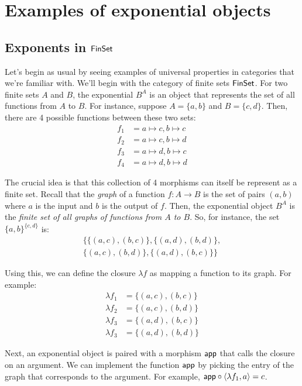 \section{Examples of exponential objects}

\subsection{Exponents in $\mathsf{FinSet}{}$}
Let's begin as usual by seeing examples of universal properties in categories 
that we're familiar with. We'll begin with the category of finite sets $\mathsf{FinSet}$.
For two finite sets $A$ and $B$, the exponential $B^A$ is an object that
represents the set of all functions from $A$ to $B$.
For instance, suppose $A = \{a, b\}$ and $B = \{c, d\}$.
Then, there are 4 possible functions between these two sets:
\begin{align*}
  f_1 &= a \mapsto c, b \mapsto c \\
  f_2 &= a \mapsto c, b \mapsto d \\
  f_3 &= a \mapsto d, b \mapsto c \\
  f_4 &= a \mapsto d, b \mapsto d
\end{align*}

The crucial idea is that this collection of 4 morphisms can itself 
be represent as a finite set.
Recall that the \emph{graph} of a function $f : A \to B$ 
is the set of pairs $(a, b)$ where $a$ is the input and $b$ is the output 
of $f$. Then, the exponential object $B^A$ is the \emph{finite 
set of all graphs of functions from $A$ to $B$}.
So, for instance, the set $\{a,b\}^{\{c, d\}}$ is:
  \begin{align*}
    \Big\{\{(a, c), (b, c)\}, \{(a, d), (b, d)\}, \\
    \{(a, c), (b, d)\}, \{(a, d), (b, c)\}\Big\}
  \end{align*}

Using this, we can define the closure $\lambda f$ as mapping a 
function to its graph. For example:
\begin{align*}
  \lambda f_1 &= \{(a, c), (b, c)\} \\
  \lambda f_2 &= \{(a, c), (b, d)\} \\
  \lambda f_3 &= \{(a, d), (b, c)\} \\
  \lambda f_3 &= \{(a, d), (b, d)\}
\end{align*}

Next, an exponential object is paired with a morphism $\mathsf{app}$ 
that calls the closure on an argument. We can implement 
the function $\mathsf{app}$ by picking the entry of the graph that corresponds 
to the argument. For example, $\mathsf{app} \circ \langle \lambda f_1, a \rangle = c$.

